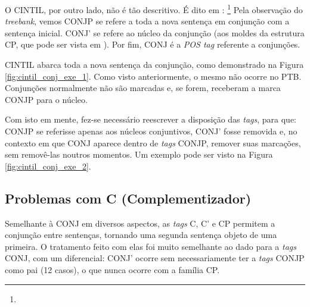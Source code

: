 \begin{center}

\end{center}
\begin{center}

\end{center}
\begin{center}

\end{center}
O CINTIL, por outro lado, não é tão descritivo. É dito em \cite[p~20]{cintil_handbook}:
\footnote{}
Pela observação do \textit{treebank}, vemos CONJP se refere a toda a nova sentença em conjunção com a sentença inicial. CONJ’ se refere ao núcleo da conjunção (aos moldes da estrutura CP, que pode ser vista em \cite[p~63]{mioto2013novo}). Por fim, CONJ é a \textit{POS tag} referente a conjunções.

CINTIL abarca toda a nova sentença da conjunção, como demonstrado na Figura \ref{fig:cintil_conj_exe_1}. Como visto anteriormente, o mesmo não ocorre no PTB. Conjunções normalmente não são marcadas e, se forem, receberam a marca CONJP para o núcleo.
\begin{center}

\end{center}
Com isto em mente, fez-se necessário reescrever a disposição das \textit{tags}, para que: CONJP se referisse apenas aos núcleos conjuntivos, CONJ’ fosse removida e, no contexto em que CONJ aparece dentro de \textit{tags} CONJP, remover suas marcações, sem removê-las noutros momentos. Um exemplo pode ser visto na Figura \ref{fig:cintil_conj_exe_2}.
\begin{center}

\end{center}

\subsection{Problemas com C (Complementizador)}
\label{subsec-cintil-c}
Semelhante à CONJ em diversos aspectos, as \textit{tags} C, C’ e CP permitem a conjunção entre sentenças, tornando uma segunda sentença objeto de uma primeira. O tratamento feito com elas foi muito semelhante ao dado para a \textit{tags} CONJ, com um diferencial: CONJ’ ocorre sem necessariamente ter a \textit{tags} CONJP como pai (12 casos), o que nunca ocorre com a família CP. 

